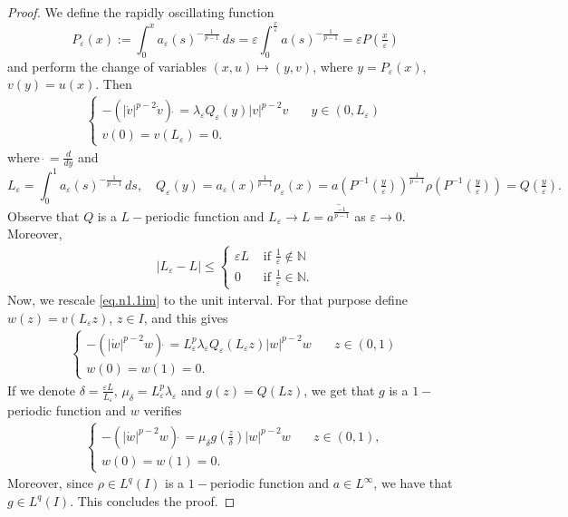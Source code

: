 \documentclass[12pt]{amsart}
\theoremstyle{definition}
\theoremstyle{remark}
\numberwithin{equation}{section}
\begin{document}
\begin{proof}
We define the rapidly oscillating function
$$
P_\varepsilon(x):=\int_0^x a_\varepsilon(s)^{-\frac{1}{p-1}}\,ds = \varepsilon\int_0^\frac{x}{\varepsilon} a(s)^{-\frac{1}{p-1}} = \varepsilon P(\tfrac{x}{\varepsilon})
$$
and perform the change of variables $(x,u)\mapsto (y,v)$, where $y=P_\varepsilon(x)$, $v(y)=u(x)$. Then
\begin{align}   \label{eq.n1.1im}
\begin{cases}
-(|\dot v|^{p-2} \dot v)\dot\, =\lambda_\varepsilon Q_\varepsilon(y) |v|^{p-2}v &\quad y\in (0,L_\varepsilon)\\
v(0)=v(L_\varepsilon)=0.
\end{cases}
\end{align}	
where $\dot\,=\tfrac{d}{dy}$ and 
$$
L_\varepsilon= \int_0^1 a_\varepsilon(s)^{-\frac{1}{p-1}}\,ds, \quad  Q_\varepsilon(y)=a_\varepsilon(x)^\frac{1}{p-1} \rho_\varepsilon(x)=a(P^{-1}(\tfrac{y}{\varepsilon}))^\frac{1}{p-1}\rho(P^{-1}(\tfrac{y}{\varepsilon}))=Q(\tfrac{y}{\varepsilon}).
$$
Observe that $Q$ is a $L-$periodic function and $L_\varepsilon \to L=\overline{a^{\frac{-1}{p-1}}}$ as $\varepsilon \to 0$.
Moreover, 
\begin{align} \label{condL}
|L_\varepsilon-L|\leq 
\begin{cases}
\varepsilon L &\text{ if } \frac{1}{\varepsilon} \not\in \mathbb N\\
0 &\text{ if } \frac{1}{\varepsilon} \in \mathbb N.
\end{cases}
\end{align}
Now, we rescale \eqref{eq.n1.1im} to the unit interval. For that purpose define $w(z)=v(L_\varepsilon z)$, $z\in I$, and this gives
\begin{align*}   
\begin{cases}
-(|\dot w|^{p-2}w)\dot\, =L_\varepsilon^p\lambda_\varepsilon Q_\varepsilon(L_\varepsilon z) |w|^{p-2}w &\quad z\in (0,1)\\
w(0)=w(1)=0.
\end{cases}
\end{align*}	
If we denote $\delta=\frac{\varepsilon L}{L_\varepsilon}$, $\mu_\delta=L^p_\varepsilon \lambda_\varepsilon$ and $g(z)=Q(Lz)$, we get that $g$ is a $1-$periodic function and $w$ verifies
\begin{align*}   
\begin{cases}
-(|\dot w|^{p-2}w)\dot\, =\mu_\delta g(\tfrac{z}{\delta}) |w|^{p-2}w &\quad z\in (0,1),\\
w(0)=w(1)=0.
\end{cases}
\end{align*}	
Moreover, since $\rho\in L^q(I)$ is a $1-$periodic function and $a\in L^\infty$, we have  that $g\in L^q(I)$. This concludes the proof.
\end{proof}
\end{document}
